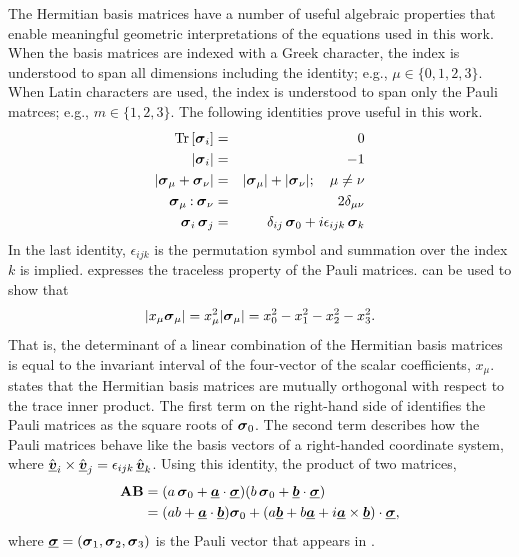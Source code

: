 The Hermitian basis matrices  have a number of useful algebraic properties that
enable meaningful geometric interpretations of the equations used in this work.
%
When the basis matrices are indexed with a Greek character, the index is understood
to span all dimensions including the identity; e.g.,  $\mu \in \{0,1,2,3\}$.  When Latin characters are used,
the index is understood to span only the Pauli matrces; e.g.,  $m \in \{1,2,3\}$.
%
The following identities prove useful in this work.
\begin{eqnarray}
    {\rm Tr} \left[ {\mbox{\boldmath $\sigma$}_{i}} \right] &=&0 \label{eqn:Pauli_trace} \\
    |\mbox{\boldmath $\sigma$}_{i}|&=&-1 \label{eqn:Pauli_determinant} \\
    |\mbox{\boldmath $\sigma$}_{\mu} + \mbox{\boldmath $\sigma$}_{\nu} | &=& |\mbox{\boldmath $\sigma$}_{\mu}| + |\mbox{\boldmath $\sigma$}_{\nu}|; \quad \mu \ne \nu \label{eqn:basis_sum_determinant} \\
    \mbox{\boldmath $\sigma$}_{\mu} \mathbin{:} \mbox{\boldmath $\sigma$}_{\nu} &=& 2 \delta_{\mu\nu} \label{eqn:basis_orthogonal} \\
    \mbox{\boldmath $\sigma$}_{i}\,\mbox{\boldmath $\sigma$}_{j} &=& \delta_{ij}\,\mbox{\boldmath $\sigma$}_{0} + i\epsilon_{ijk}\,\mbox{\boldmath $\sigma$}_{k} \label{eqn:Pauli_product}
\end{eqnarray}
%
In the last identity, $\epsilon_{ijk}$ is the permutation symbol and summation over the index $k$ is implied.
%
 expresses the traceless property of the Pauli matrices.
%
 can be used to show that
\begin{equation}
| x_\mu \mbox{\boldmath $\sigma$}_{\mu} | = x_\mu^2 |\mbox{\boldmath $\sigma$}_{\mu}| = x_0^2 -x_1^2 -x_2^2 - x_3^2.
\label{eqn:determinant_is_invariant}
\end{equation}
%
That is, the determinant of a linear combination of the Hermitian
basis matrices is equal to the invariant interval of the 
four-vector of the scalar coefficients, $x_\mu$.
%
%
 states that the Hermitian basis matrices
are mutually orthogonal with respect to the trace inner product.
%
The first term on the right-hand side of  identifies
the Pauli matrices as the square roots of $\mbox{\boldmath $\sigma$}_{0}$.  
The second term describes how the Pauli matrices
behave like the basis vectors of a right-handed coordinate system, 
where $\hat{\underline{\mbox{\boldmath $v$}}}_i \times \hat{\underline{\mbox{\boldmath $v$}}}_j = \epsilon_{ijk}\,\hat{\underline{\mbox{\boldmath $v$}}}_k$.
%
Using this identity, the product of two matrices,
\begin{equation}
\begin{split}
{\bf A}{\bf B} &=
 (a\,\mbox{\boldmath $\sigma$}_{0}+\underline{\mbox{\boldmath $a$}}\cdot\underline{\mbox{\boldmath $\sigma$}})(b\,\mbox{\boldmath $\sigma$}_{0} + \underline{\mbox{\boldmath $b$}}\cdot\underline{\mbox{\boldmath $\sigma$}}) \\
        &=
 (ab + \underline{\mbox{\boldmath $a$}}\cdot\underline{\mbox{\boldmath $b$}})\mbox{\boldmath $\sigma$}_{0} + (a\underline{\mbox{\boldmath $b$}} + b\underline{\mbox{\boldmath $a$}}
    + i \underline{\mbox{\boldmath $a$}}\times\underline{\mbox{\boldmath $b$}}) \cdot \underline{\mbox{\boldmath $\sigma$}},
    \label{eqn:multiplication_rule} 
\end{split}
\end{equation}
where $\underline{\mbox{\boldmath $\sigma$}}=\left( \mbox{\boldmath $\sigma$}_{1},  \mbox{\boldmath $\sigma$}_{2}, \mbox{\boldmath $\sigma$}_{3} \right)$ is
the Pauli vector that appears in .

